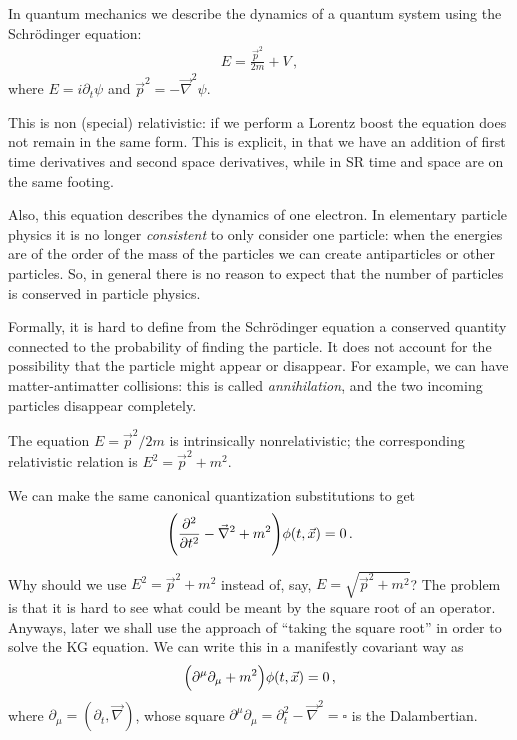 \documentclass[main.tex]{subfiles}
\begin{document}
In quantum mechanics we describe the dynamics of a quantum system using the Schrö\-din\-ger equation: 
%
\begin{align}
E = \frac{\vec{p}^2}{2m } + V
\,,
\end{align}
%
where \(E = i \partial_{t} \psi \) and \(\vec{p}^2 = - \vec{\nabla}^2 \psi \). 

This is non (special) relativistic: if we perform a Lorentz boost the equation does not remain in the same form. This is explicit, in that we have an addition of first time derivatives and second space derivatives, while in SR time and space are on the same footing.

Also, this equation describes the dynamics of one electron. In elementary particle physics it is no longer \emph{consistent} to only consider one particle: 
when the energies are of the order of the mass of the particles we can create antiparticles or other particles. 
So, in general there is no reason to expect that the number of particles is conserved in particle physics. 

Formally, it is hard to define from the Schrödinger equation a conserved quantity connected to the probability of finding the particle. 
It does not account for the possibility that the particle might appear or disappear. 
For example, we can have matter-antimatter collisions: this is called \emph{annihilation}, and the two incoming particles disappear completely.

The equation \(E = \vec{p}^2 / 2m \) is intrinsically nonrelativistic; the corresponding relativistic relation is \(E^2 = \vec{p}^2 + m^2\). 

We can make the same canonical quantization substitutions to get 
%
\begin{align}
\qty(\pdv[2]{}{t} - \vec{\nabla}^2 + m^2) \phi (t, \vec{x}) = 0
\,.
\end{align}

Why should we use \(E^2 = \vec{p}^2 + m^2\) instead of, say, \(E = \sqrt{\vec{p}^2 + m^2}\)? 
The problem is that it is hard to see what could be meant by the square root of an operator. 
Anyways, later we shall use the approach of ``taking the square root'' in order to solve the KG equation. 
We can write this in a manifestly covariant way as 
%
\begin{align}
\qty(\partial^{\mu } \partial_{\mu } + m^2) \phi (t, \vec{x}) = 0
\,,
\end{align}
%
where \(\partial_{\mu } = (\partial_{t}, \vec{\nabla})\), whose square \(\partial^{\mu } \partial_{\mu } = \partial_{t}^2 - \vec{\nabla}^2 = \square\) is the Dalambertian.
\end{document}
